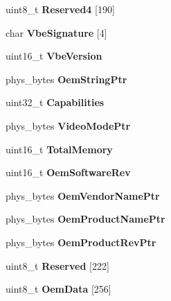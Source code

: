 \begin{DoxyCompactItemize}
\item 
\hypertarget{group__vbe_ga2e13c4795a00241b919aa3aab86560ce}{}uint8\+\_\+t {\bfseries Reserved4} \mbox{[}190\mbox{]}\label{group__vbe_ga2e13c4795a00241b919aa3aab86560ce}

\item 
\hypertarget{group__vbe_gafd3a8744ce19caa07755c2604cce884c}{}char {\bfseries Vbe\+Signature} \mbox{[}4\mbox{]}\label{group__vbe_gafd3a8744ce19caa07755c2604cce884c}

\item 
\hypertarget{group__vbe_ga7b9fef89774326b46f9481cbd9a397d3}{}uint16\+\_\+t {\bfseries Vbe\+Version}\label{group__vbe_ga7b9fef89774326b46f9481cbd9a397d3}

\item 
\hypertarget{group__vbe_ga20ab55e9dda8d437875255529c1cffe8}{}phys\+\_\+bytes {\bfseries Oem\+String\+Ptr}\label{group__vbe_ga20ab55e9dda8d437875255529c1cffe8}

\item 
\hypertarget{group__vbe_gaf005ca0116fa8ac69ef6198824f4d659}{}uint32\+\_\+t {\bfseries Capabilities}\label{group__vbe_gaf005ca0116fa8ac69ef6198824f4d659}

\item 
\hypertarget{group__vbe_ga9d989fdbcdad6a40c10fc28c0f9af760}{}phys\+\_\+bytes {\bfseries Video\+Mode\+Ptr}\label{group__vbe_ga9d989fdbcdad6a40c10fc28c0f9af760}

\item 
\hypertarget{group__vbe_ga3e7b41e709394a10b3667e7f27f1aa7a}{}uint16\+\_\+t {\bfseries Total\+Memory}\label{group__vbe_ga3e7b41e709394a10b3667e7f27f1aa7a}

\item 
\hypertarget{group__vbe_ga133984a56ec19abf4fcb2e6ae71d6498}{}uint16\+\_\+t {\bfseries Oem\+Software\+Rev}\label{group__vbe_ga133984a56ec19abf4fcb2e6ae71d6498}

\item 
\hypertarget{group__vbe_gaffd3a330afde841405f89bbcd05af4f0}{}phys\+\_\+bytes {\bfseries Oem\+Vendor\+Name\+Ptr}\label{group__vbe_gaffd3a330afde841405f89bbcd05af4f0}

\item 
\hypertarget{group__vbe_gafd3d28c2078a683b1ed64ea21905fcfe}{}phys\+\_\+bytes {\bfseries Oem\+Product\+Name\+Ptr}\label{group__vbe_gafd3d28c2078a683b1ed64ea21905fcfe}

\item 
\hypertarget{group__vbe_ga239cba41d0489da5b79556b45797c6b0}{}phys\+\_\+bytes {\bfseries Oem\+Product\+Rev\+Ptr}\label{group__vbe_ga239cba41d0489da5b79556b45797c6b0}

\item 
\hypertarget{group__vbe_ga2c3b1cbb6bad5c51d4be4e57255a61d2}{}uint8\+\_\+t {\bfseries Reserved} \mbox{[}222\mbox{]}\label{group__vbe_ga2c3b1cbb6bad5c51d4be4e57255a61d2}

\item 
\hypertarget{group__vbe_ga966ae75c33c2d65b4f0c916f093acac0}{}uint8\+\_\+t {\bfseries Oem\+Data} \mbox{[}256\mbox{]}\label{group__vbe_ga966ae75c33c2d65b4f0c916f093acac0}

\end{DoxyCompactItemize}


